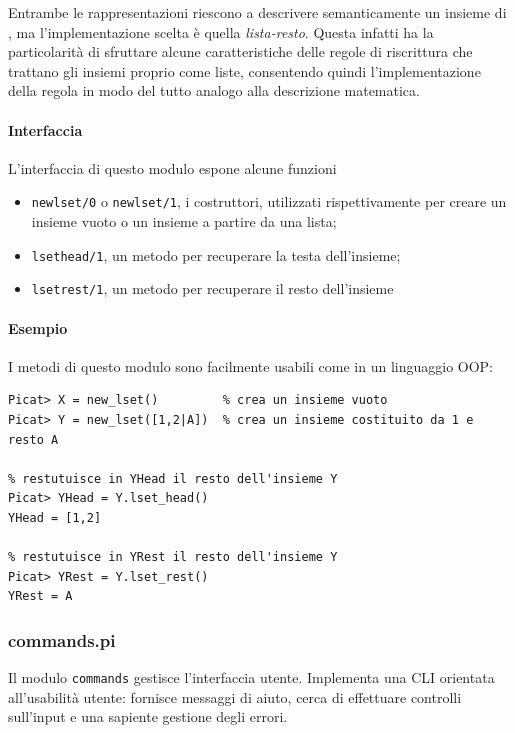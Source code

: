 \documentclass[12pt,a4paper,openright]{book}  %
\begin{document}
Entrambe le rappresentazioni riescono a descrivere semanticamente un
insieme di \lset{}, ma l'implementazione scelta è quella
\emph{lista-resto}. Questa infatti ha la particolarità di sfruttare
alcune caratteristiche delle regole di riscrittura che trattano gli
insiemi proprio come liste, consentendo quindi l'implementazione della
regola in modo del tutto analogo alla descrizione matematica.

\paragraph{Interfaccia}

L'interfaccia di questo modulo espone alcune funzioni
\begin{itemize}
	\item \texttt{new\textunderscore lset/0} o
          \texttt{new\textunderscore lset/1}, i costruttori,
          utilizzati rispettivamente per creare un insieme vuoto o un
          insieme a partire da una lista;
	\item \texttt{lset\textunderscore head/1}, un metodo per
          recuperare la testa dell'insieme;
	\item \texttt{lset\textunderscore rest/1}, un metodo per
          recuperare il resto dell'insieme
\end{itemize}

\paragraph{Esempio}

I metodi di questo modulo sono facilmente usabili come in un
linguaggio OOP:
\begin{verbatim}
Picat> X = new_lset()         % crea un insieme vuoto
Picat> Y = new_lset([1,2|A])  % crea un insieme costituito da 1 e resto A

% restutuisce in YHead il resto dell'insieme Y
Picat> YHead = Y.lset_head()
YHead = [1,2]

% restutuisce in YRest il resto dell'insieme Y
Picat> YRest = Y.lset_rest()
YRest = A
\end{verbatim}


\subsubsection{commands.pi}

Il modulo \texttt{commands} gestisce l'interfaccia utente. Implementa
una CLI orientata all'usabilità utente: fornisce messaggi di aiuto,
cerca di effettuare controlli sull'input e una sapiente gestione degli
errori.
\end{document}
